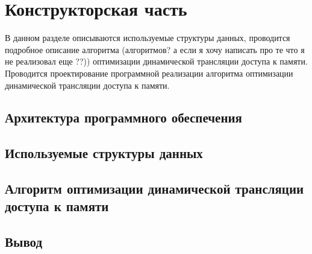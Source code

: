\section{Конструкторская часть}

В данном разделе описываются используемые структуры данных, проводится
подробное описание алгоритма (алгоритмов? а если я хочу написать про те что я не реализовал еще ??)) оптимизации динамической трансляции доступа к памяти. Проводится проектирование программной реализации алгоритма оптимизации динамической трансляции доступа к памяти.

\subsection{Архитектура программного обеспечения}

\subsection{Используемые структуры данных}

\subsection{Алгоритм оптимизации динамической трансляции доступа к памяти}

\subsection{Вывод}

\pagebreak